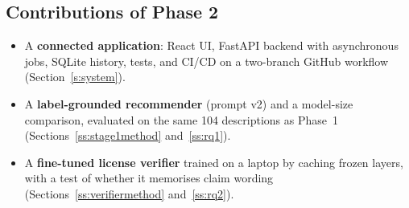 \subsection{Contributions of Phase 2}
\begin{itemize}
    \item A \textbf{connected application}: React UI, FastAPI backend with asynchronous jobs, SQLite history, tests, and CI/CD on a two-branch GitHub workflow (Section~\ref{s:system}).
    \item A \textbf{label-grounded recommender} (prompt v2) and a model-size comparison, evaluated on the same 104 descriptions as Phase~1 (Sections~\ref{ss:stage1method} and~\ref{ss:rq1}).
    \item A \textbf{fine-tuned license verifier} trained on a laptop by caching frozen layers, with a test of whether it memorises claim wording (Sections~\ref{ss:verifiermethod} and~\ref{ss:rq2}).
\end{itemize}
